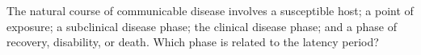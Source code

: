 The natural course of communicable disease involves a susceptible host; a point of exposure; a subclinical disease phase; the clinical disease phase; and a phase of recovery, disability, or death.  Which phase is related to the latency period?

\begin{MultipleChoice}[itemname=I-18]
\end{MultipleChoice}

